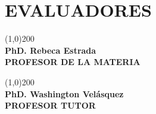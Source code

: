 \chapter*{EVALUADORES}
\thispagestyle{empty}
\vspace{15.0em}
\begin{minipage}[t]{.45\textwidth}
    \centering
    \line(1,0){200} \\[0.5em]
    \textbf{PhD. Rebeca Estrada} \\
    \textbf{PROFESOR DE LA MATERIA}
\end{minipage}
\hfill
\begin{minipage}[t]{.45\textwidth}
    \centering
    \line(1,0){200} \\[0.5em]
    \textbf{PhD. Washington Vel\'asquez} \\
    \textbf{PROFESOR TUTOR}
\end{minipage}